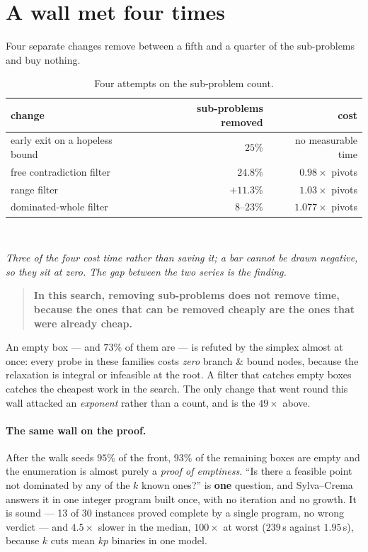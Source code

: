 \documentclass[11pt,a4paper]{article}
\begin{document}
\section{A wall met four times}

Four separate changes remove between a fifth and a quarter of the sub-problems
and buy nothing.

\begin{table}[h]
\centering
\caption{Four attempts on the sub-problem count.}
\begin{tabular}{lrr}
\toprule
change & sub-problems removed & cost \\
\midrule
early exit on a hopeless bound    & $25\%$       & no measurable time \\
free contradiction filter         & $24.8\%$     & $0.98\times$ pivots \\
range filter                      & $+11.3\%$    & $1.03\times$ pivots \\
dominated-whole filter            & $8$--$23\%$  & $1.077\times$ pivots \\
\bottomrule
\end{tabular}
\end{table}

\begin{center}
\\[2pt]
\end{center}
\noindent
\emph{Three of the four cost time rather than saving it; a bar cannot be drawn
negative, so they sit at zero.  The gap between the two series is the finding.}

\begin{quote}
\textbf{In this search, removing sub-problems does not remove time, because the
ones that can be removed cheaply are the ones that were already cheap.}
\end{quote}

\noindent
An empty box --- and $73\%$ of them are --- is refuted by the simplex almost at
once: every probe in these families costs \emph{zero} branch \& bound nodes,
because the relaxation is integral or infeasible at the root.  A filter that
catches empty boxes catches the cheapest work in the search.  The only change
that went round this wall attacked an \emph{exponent} rather than a count, and
is the $49\times$ above.

\paragraph{The same wall on the proof.}  After the walk seeds $95\%$ of the
front, $93\%$ of the remaining boxes are empty and the enumeration is almost
purely a \emph{proof of emptiness}.  ``Is there a feasible point not dominated
by any of the $k$ known ones?'' is \textbf{one} question, and Sylva--Crema
answers it in one integer program built once, with no iteration and no growth.
It is sound --- 13 of 30 instances proved complete by a single program, no
wrong verdict --- and $4.5\times$ slower in the median, $100\times$ at worst
($239$\,s against $1.95$\,s), because $k$ cuts mean $kp$ binaries in one model.
\end{document}
